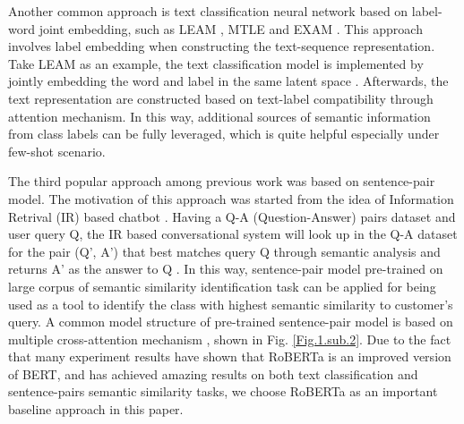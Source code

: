 \documentclass[letterpaper]{article} %
\begin{document}
  Another  common  approach  is  text  classification  neural  network  based on
  label-word     joint     embedding,    such    as    LEAM \cite{wang2018joint},
  MTLE \cite{zhang2017multi}   and   EXAM \cite{du2019explicit}.   This   approach
  involves  label  embedding when constructing the text-sequence representation.
  Take  LEAM  as  an  example,  the  text classification model is implemented by
  jointly    embedding    the    word    and    label   in   the   same   latent
  space \cite{wang2018joint}. Afterwards, the text representation are constructed
  based  on  text-label  compatibility through attention mechanism. In this way,
  additional  sources  of  semantic  information  from class labels can be fully
  leveraged, which is quite helpful especially under few-shot scenario.

  The  third  popular  approach  among  previous work was based on sentence-pair
  model.  The  motivation  of  this  approach  was  started  from  the  idea  of
  Information     Retrival    (IR)    based    chatbot \cite{jafarpour2010filter,
  leuski2011npceditor}.  Having  a  Q-A (Question-Answer) pairs dataset and user
  query  Q,  the  IR based conversational system will look up in the Q-A dataset
  for  the pair (Q', A') that best matches query Q through semantic analysis and
  returns   A'   as   the  answer  to  Q \cite{mnasri2019recent}.  In  this  way,
  sentence-pair  model  pre-trained  on  large  corpus  of  semantic  similarity
  identification  task  can  be applied for being used as a tool to identify the
  class  with  highest  semantic  similarity to customer's query. A common model
  structure  of pre-trained \cite{devlin2018bert} sentence-pair model is based on
  multiple  cross-attention  mechanism \cite{barkan2020scalable},  shown  in Fig.
  \ref{Fig.1.sub.2}.  Due  to  the  fact that many experiment results have shown
  that  RoBERTa \cite{liu2019roberta}  is  an  improved  version of BERT, and has
  achieved  amazing  results  on  both  text  classification  and sentence-pairs
  semantic similarity tasks, we choose RoBERTa as an important baseline approach
  in this paper.
\end{document}
